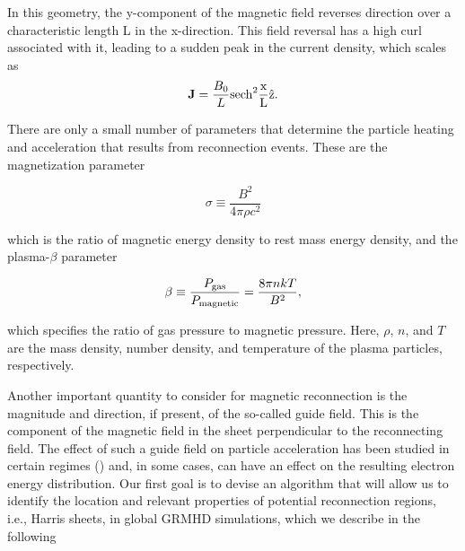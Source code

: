 In this geometry, the y-component of the magnetic field
reverses direction over a characteristic length L in the
x-direction. This field reversal has a high curl associated
with it, leading to a sudden peak in the current density,
which scales as
\begin{equation}
	\bold{J}= \frac{B_0}{L}\rm{sech}^2\frac{x}{L}\hat{z}.
\end{equation}

There are only a small number of parameters that determine the particle heating and acceleration that results from reconnection events.  These are the magnetization parameter

\begin{equation}
	\sigma \equiv \frac{B^2}{4 \pi \rho c^2}
\end{equation}

which is the ratio of magnetic energy density to rest mass energy density, and the plasma-$\beta$ parameter

\begin{equation}
	\beta \equiv \frac{P_{\rm{gas}}}{P_{\rm{magnetic}}}=\frac{8\pi n k T}{B^2},
\end{equation} 

which specifies the ratio of gas pressure to magnetic pressure.  Here, $\rho$, $n$, and $T$ are the mass density, number density, and temperature of the plasma particles, respectively.

Another important quantity to consider for magnetic
reconnection is the magnitude and direction, if present,
of the so-called guide field. This is the component of the
magnetic field in the sheet perpendicular to the reconnecting field. The effect of such a guide field on particle
acceleration has been studied in certain regimes (\citealt{wang2016, dahlin2016, stanier2016}) and, in
some cases, can have an effect on the resulting electron
energy distribution.
Our first goal is to devise an algorithm that will allow
us to identify the location and relevant properties of potential reconnection regions, i.e., Harris sheets, in global
GRMHD simulations, which we describe in the following


